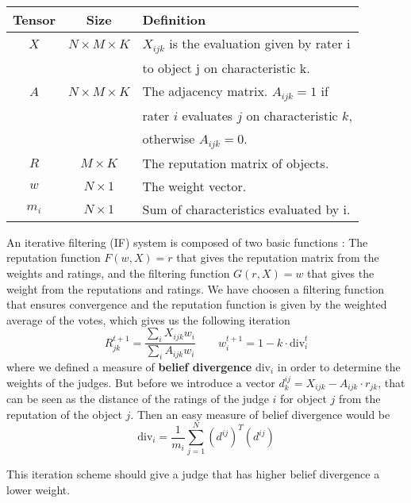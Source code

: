 \documentclass[9pt]{SelfArx} %
\begin{document}
\begin{table}[h]
\centering
\begin{tabular}{@{}ccl@{}}
\toprule
Tensor & Size                  & Definition                                                                                                     \\ \midrule
$X$    & $N \times M \times K$ & $X_{ijk}$ is the evaluation given by rater i\\
          &                                     &  to object j on characteristic k. \\
$A$    & $N \times M \times K$ & The adjacency matrix. $A_{ijk} = 1$ if \\
          &                                & rater $i$ evaluates $j$ on characteristic $k$, \\
          &                                & otherwise $A_{ijk} = 0$. \\
$R$    & $M \times K$          & The reputation matrix of objects. \\
$w$    & $N \times 1$          & The weight vector.     \\
$m_i$ & $N \times 1$          & Sum of characteristics evaluated by i. \\                                                                                      
\end{tabular}
\end{table}

An iterative filtering (IF) system is composed of two basic functions \cite{Cristo1}: The reputation function $F(w, X) = r$ that gives the reputation matrix from the weights and ratings, and the filtering function $G(r, X) = w$ that gives the weight from the reputations and ratings. We have choosen a filtering function that ensures convergence and the reputation function is given by the weighted average of the votes, which gives us the following iteration
\[
    R^{t+1}_{jk} = \frac{\sum_i X_{ijk}w_i}{\sum_i A_{ijk} w_i}
    \qquad
    w^{t+1}_i = 1 - k \cdot \mathrm{div}^t_i
\]
where we defined a measure of \textbf{belief divergence} $\mathrm{div}_i$ in order to determine the weights of the judges. But before we introduce a vector $d^{ij}_k = X_{ijk} - A_{ijk} \cdot r_{jk}$, that can be seen as the distance of the ratings of the judge $i$ for object $j$ from the reputation of the object $j$. Then an easy measure of belief divergence would be
\[
   \mathrm{div}_i = \frac{1}{m_i} \sum_{j=1}^{N} (d^{ij})^T(d^{ij})
\]

This iteration scheme should give a judge that has higher belief divergence a lower weight.\\
\end{document}

